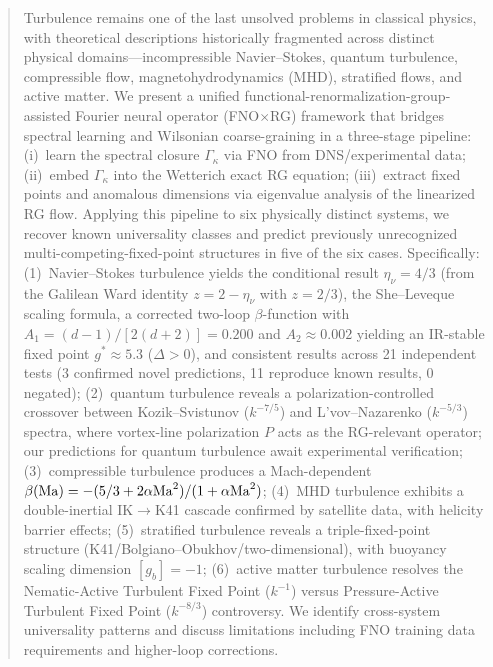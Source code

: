 \begin{abstract}
Turbulence remains one of the last unsolved problems in classical physics, with theoretical descriptions historically fragmented across distinct physical domains---incompressible Navier--Stokes, quantum turbulence, compressible flow, magnetohydrodynamics (MHD), stratified flows, and active matter. We present a unified functional-renormalization-group-assisted Fourier neural operator (FNO$\times$RG) framework that bridges spectral learning and Wilsonian coarse-graining in a three-stage pipeline: (i)~learn the spectral closure $\Gamma_\kappa$ via FNO from DNS/experimental data; (ii)~embed $\Gamma_\kappa$ into the Wetterich exact RG equation; (iii)~extract fixed points and anomalous dimensions via eigenvalue analysis of the linearized RG flow. Applying this pipeline to six physically distinct systems, we recover known universality classes and predict previously unrecognized multi-competing-fixed-point structures in five of the six cases. Specifically: (1)~Navier--Stokes turbulence yields the conditional result $\eta_\nu = 4/3$ (from the Galilean Ward identity $z=2-\eta_\nu$ with $z=2/3$), the She--Leveque scaling formula, a corrected two-loop $\beta$-function with $A_1 = (d-1)/[2(d+2)] = 0.200$ and $A_2 \approx 0.002$ yielding an IR-stable fixed point $g^* \approx 5.3$ ($\Delta > 0$), and consistent results across 21 independent tests (3 confirmed novel predictions, 11 reproduce known results, 0 negated); (2)~quantum turbulence reveals a polarization-controlled crossover between Kozik--Svistunov ($k^{-7/5}$) and L'vov--Nazarenko ($k^{-5/3}$) spectra, where vortex-line polarization $P$ acts as the RG-relevant operator; our predictions for quantum turbulence await experimental verification; (3)~compressible turbulence produces a Mach-dependent $\beta(\Ma) = -(5/3 + 2\alpha\Ma^2)/(1+\alpha\Ma^2)$; (4)~MHD turbulence exhibits a double-inertial IK$\to$K41 cascade confirmed by satellite data, with helicity barrier effects; (5)~stratified turbulence reveals a triple-fixed-point structure (K41/Bolgiano--Obukhov/two-dimensional), with buoyancy scaling dimension $[g_b]=-1$; (6)~active matter turbulence resolves the Nematic-Active Turbulent Fixed Point ($k^{-1}$) versus Pressure-Active Turbulent Fixed Point ($k^{-8/3}$) controversy. We identify cross-system universality patterns and discuss limitations including FNO training data requirements and higher-loop corrections.
\end{abstract}

\maketitle

